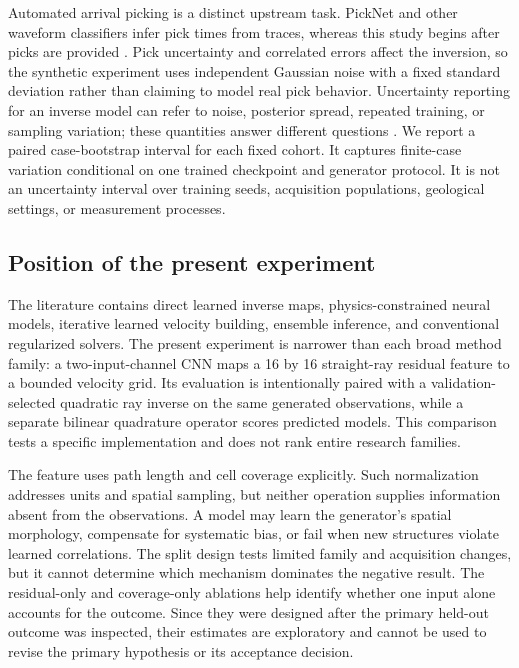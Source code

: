 \documentclass[11pt]{article}
\begin{document}
Automated arrival picking is a distinct upstream task. PickNet and other waveform classifiers infer pick times from traces, whereas this study begins after picks are provided \cite{WangPickNet2019,ZhuBeroza2019}. Pick uncertainty and correlated errors affect the inversion, so the synthetic experiment uses independent Gaussian noise with a fixed standard deviation rather than claiming to model real pick behavior. Uncertainty reporting for an inverse model can refer to noise, posterior spread, repeated training, or sampling variation; these quantities answer different questions \cite{MosegaardTarantola1995,ScalesSnieder1997}. We report a paired case-bootstrap interval for each fixed cohort. It captures finite-case variation conditional on one trained checkpoint and generator protocol. It is not an uncertainty interval over training seeds, acquisition populations, geological settings, or measurement processes.

\subsection{Position of the present experiment}
\label{sec:related-position}
The literature contains direct learned inverse maps, physics-constrained neural models, iterative learned velocity building, ensemble inference, and conventional regularized solvers. The present experiment is narrower than each broad method family: a two-input-channel CNN maps a 16 by 16 straight-ray residual feature to a bounded velocity grid. Its evaluation is intentionally paired with a validation-selected quadratic ray inverse on the same generated observations, while a separate bilinear quadrature operator scores predicted models. This comparison tests a specific implementation and does not rank entire research families.

The feature uses path length and cell coverage explicitly. Such normalization addresses units and spatial sampling, but neither operation supplies information absent from the observations. A model may learn the generator's spatial morphology, compensate for systematic bias, or fail when new structures violate learned correlations. The split design tests limited family and acquisition changes, but it cannot determine which mechanism dominates the negative result. The residual-only and coverage-only ablations help identify whether one input alone accounts for the outcome. Since they were designed after the primary held-out outcome was inspected, their estimates are exploratory and cannot be used to revise the primary hypothesis or its acceptance decision.
\end{document}

